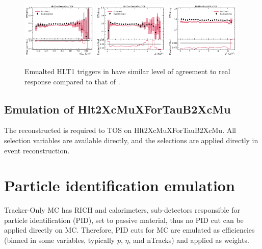 \begin{figure}[ht]
    \includegraphics[width=0.32\textwidth]{
        ./figs-mc-emulation/emulate-hlt1/b0_Hlt1TwoTrackMVA_TOS_mmiss2.pdf
    }
    \includegraphics[width=0.32\textwidth]{
        ./figs-mc-emulation/emulate-hlt1/b0_Hlt1TwoTrackMVA_TOS_el.pdf
    }
    \includegraphics[width=0.32\textwidth]{
        ./figs-mc-emulation/emulate-hlt1/b0_Hlt1TwoTrackMVA_TOS_q2.pdf
    }

    \caption{
        Emualted HLT1 triggers in \Bz have similar level of agreement to real
        response compared to that of \Bp.
    }
    \label{fig:hlt1-twotrackmva-emu}
\end{figure}


\subsection{Emulation of Hlt2XcMuXForTauB2XcMu}

The reconstructed \B is required to TOS on Hlt2XcMuXForTauB2XcMu. All selection
variables are available directly, and the selections are applied directly in
event reconstruction.


\section{Particle identification emulation}
\label{sec:emulation-for-to-mc:pid}

Tracker-Only MC has RICH and calorimeters, sub-detectors responsible for
particle identification (PID), set to passive material, thus no PID cut can be
applied directly on MC.
Therefore, PID cuts for MC are emulated as efficiencies (binned in some
variables, typically $p$, $\eta$, and nTracks) and applied as weights.

